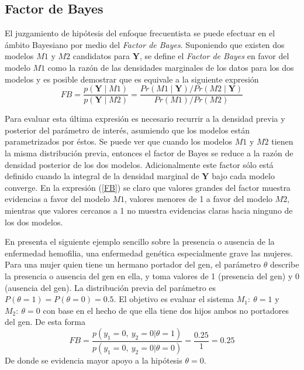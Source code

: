 \documentclass[10pt,openright]{book}\usepackage[]{graphicx}\usepackage[]{color}
\begin{document}
\subsection{Factor de Bayes}
El juzgamiento de hipótesis del enfoque frecuentista se puede efectuar en el ámbito Bayesiano por medio del \emph{Factor de Bayes}. Suponiendo que existen dos modelos $M1$ y $M2$ candidatos para $\mathbf{Y}$, se define el \emph{Factor de Bayes} en favor del modelo $M1$ como la razón de las densidades marginales de los datos para los dos modelos y es posible demostrar que es equivale a la siguiente expresión
\begin{equation}\label{FB}
FB=\frac{p(\mathbf{Y} \mid M1)}{p(\mathbf{Y} \mid M2)}=\frac{Pr(M1 \mid \mathbf{Y})/Pr(M2 \mid \mathbf{Y})}{Pr(M1)/Pr(M2)}
\end{equation}

Para evaluar esta última expresión es necesario recurrir a la densidad previa y posterior del parámetro de interés, asumiendo que los modelos están parametrizados por éstos. Se puede ver que cuando los modelos $M1$ y $M2$ tienen la misma distribución previa, entonces el factor de Bayes se reduce a la razón de densidad posterior de los dos modelos. Adicionalmente este factor sólo está definido cuando la integral de la densidad marginal de $\mathbf{Y}$ bajo cada modelo converge. En la expresión (\ref{FB}) se claro que valores grandes del factor muestra evidencias a favor del modelo $M1$, valores menores de 1 a favor del modelo $M2$, mientras que valores cercanos a 1 no muestra evidencias claras hacia ninguno de los dos modelos.

En  presenta el siguiente ejemplo sencillo sobre la presencia o ausencia de la enfermedad hemofilia, una enfermedad genética especialmente grave las mujeres. Para una mujer quien tiene un hermano portador del gen, el parámetro $\theta$ describe la presencia o ausencia del gen en ella, y toma valores de 1 (presencia del gen) y 0 (ausencia del gen). La distribución previa del parámetro es $P(\theta=1)=P(\theta=0)=0.5$. El objetivo es evaluar el sistema $M_1:\ \theta=1$ y $M_2:\ \theta=0$ con base en el hecho de que ella tiene dos hijos ambos no portadores del gen. De esta forma
\begin{equation*}
FB=\frac{p(y_1=0,\ y_2=0|\theta=1)}{p(y_1=0,\ y_2=0|\theta=0)}=\frac{0.25}{1}=0.25
\end{equation*}
De donde se evidencia mayor apoyo a la hipótesis $\theta=0$.
\end{document}
